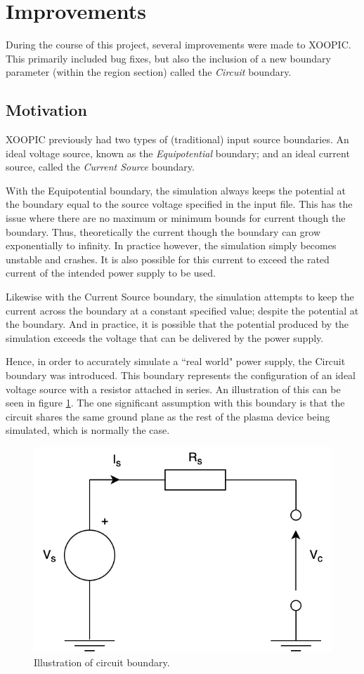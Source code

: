 \section{Improvements}

During the course of this project, several improvements were made to XOOPIC. This primarily included bug fixes, but also the inclusion of a new boundary parameter (within the region section) called the \textit{Circuit} boundary. 

\subsection{Motivation}

XOOPIC previously had two types of (traditional) input source boundaries. An ideal voltage source, known as the \textit{Equipotential} boundary; and an ideal current source, called the \textit{Current Source} boundary. 

With the Equipotential boundary, the simulation always keeps the potential at the boundary equal to the source voltage specified in the input file. This has the issue where there are no maximum or minimum bounds for current though the boundary. Thus, theoretically the current though the boundary can grow exponentially to infinity. In practice however, the simulation simply becomes unstable and crashes. It is also possible for this current to exceed the rated current of the intended power supply to be used.

Likewise with the Current Source boundary, the simulation attempts to keep the current across the boundary at a constant specified value; despite the potential at the boundary. And in practice, it is possible that the potential produced by the simulation exceeds the voltage that can be delivered by the power supply. 

Hence, in order to accurately simulate a ``real world" power supply, the Circuit boundary was introduced. This boundary represents the configuration of an ideal voltage source with a resistor attached in series. An illustration of this can be seen in figure \ref{fig:circuit}. The one significant assumption with this boundary is that the circuit shares the same ground plane as the rest of the plasma device being simulated, which is normally the case. 

\begin{figure}[h!]
	\centering
	\includegraphics[width=0.59\linewidth]{xoopic/figures/circuit.png}
	\caption{Illustration of circuit boundary.}
	\label{fig:circuit}
\end{figure} 

